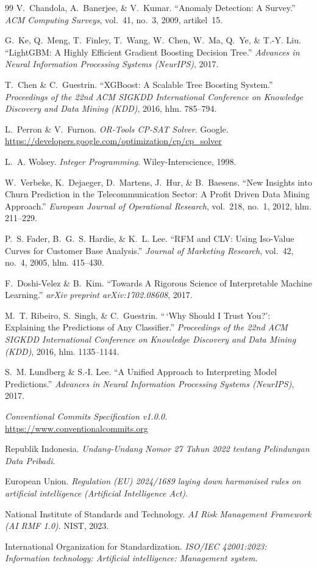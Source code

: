 \documentclass[12pt,a4paper]{article}
\begin{document}
\begin{thebibliography}{99}
V.~Chandola, A.~Banerjee, \& V.~Kumar. ``Anomaly Detection: A Survey.'' \textit{ACM Computing Surveys}, vol.~41, no.~3, 2009, artikel~15.

G.~Ke, Q.~Meng, T.~Finley, T.~Wang, W.~Chen, W.~Ma, Q.~Ye, \& T.-Y. Liu. ``LightGBM: A Highly Efficient Gradient Boosting Decision Tree.'' \textit{Advances in Neural Information Processing Systems (NeurIPS)}, 2017.

T.~Chen \& C.~Guestrin. ``XGBoost: A Scalable Tree Boosting System.'' \textit{Proceedings of the 22nd ACM SIGKDD International Conference on Knowledge Discovery and Data Mining (KDD)}, 2016, hlm. 785--794.

L.~Perron \& V.~Furnon. \textit{OR-Tools CP-SAT Solver}. Google. \url{https://developers.google.com/optimization/cp/cp_solver}

L.~A. Wolsey. \textit{Integer Programming}. Wiley-Interscience, 1998.

W.~Verbeke, K.~Dejaeger, D.~Martens, J.~Hur, \& B.~Baesens. ``New Insights into Churn Prediction in the Telecommunication Sector: A Profit Driven Data Mining Approach.'' \textit{European Journal of Operational Research}, vol.~218, no.~1, 2012, hlm. 211--229.

P.~S. Fader, B.~G.~S. Hardie, \& K.~L. Lee. ``RFM and CLV: Using Iso-Value Curves for Customer Base Analysis.'' \textit{Journal of Marketing Research}, vol.~42, no.~4, 2005, hlm. 415--430.

F.~Doshi-Velez \& B.~Kim. ``Towards A Rigorous Science of Interpretable Machine Learning.'' \textit{arXiv preprint arXiv:1702.08608}, 2017.

M.~T. Ribeiro, S.~Singh, \& C.~Guestrin. ``\,`Why Should I Trust You?': Explaining the Predictions of Any Classifier.'' \textit{Proceedings of the 22nd ACM SIGKDD International Conference on Knowledge Discovery and Data Mining (KDD)}, 2016, hlm. 1135--1144.

S.~M. Lundberg \& S.-I. Lee. ``A Unified Approach to Interpreting Model Predictions.'' \textit{Advances in Neural Information Processing Systems (NeurIPS)}, 2017.

\textit{Conventional Commits Specification v1.0.0}. \url{https://www.conventionalcommits.org}

Republik Indonesia. \textit{Undang-Undang Nomor 27 Tahun 2022 tentang Pelindungan Data Pribadi}.

European Union. \textit{Regulation (EU) 2024/1689 laying down harmonised rules on artificial intelligence (Artificial Intelligence Act)}.

National Institute of Standards and Technology. \textit{AI Risk Management Framework (AI RMF 1.0)}. NIST, 2023.

International Organization for Standardization. \textit{ISO/IEC 42001:2023: Information technology: Artificial intelligence: Management system}.

\end{thebibliography}
\end{document}
